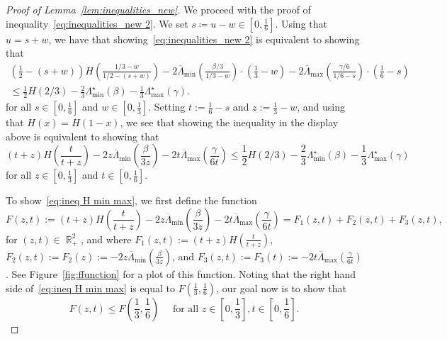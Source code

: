 \documentclass[11pt]{article}
\numberwithin{equation}{section}
\DeclareMathOperator{\R}{\mathbb{R}} %
\theoremstyle{definition}
\begin{document}
\begin{proof}[Proof of Lemma~\ref{lem:inequalities_new}]
We proceed with the proof of inequality~\eqref{eq:inequalities_new 2}. 
We set $s\coloneqq u-w \in \left[0,\frac{1}{6} \right]$. Using that $u=s+w$, we have that showing~\eqref{eq:inequalities_new 2} is equivalent to showing that 
\begin{multline*}
         \left( \frac{1}{2} - (s+w) \right) H\left(\frac{1/3 - w}{1/2 - (s+w)}\right) - 2\overline{\Lambda}_{\min} \left(  \frac{\beta/3}{1/3 - w} \right) \cdot \left( \frac{1}{3} - w \right)
     - 2\overline{\Lambda}_{\max} \left(\frac{\gamma /6}{1/6 - s} \right) \cdot \left( \frac{1}{6} - s \right)\\
         \leq \frac{1}{2}H(2/3) - \frac{2}{3} \Lambda_{\min}^{\star} (\beta)-\frac{1}{3} \Lambda_{\max}^{\star} (\gamma).
\end{multline*}
for all $s\in \left[0,\frac{1}{6}\right]$ and $w\in \left[0,\frac{1}{3} \right]$. 
Setting 
$t:=\frac{1}{6}-s$ and 
$z:=\frac{1}{3}-w$, 
and using that $H(x)=H(1-x)$, we see that showing the inequality in the display above is equivalent to showing that
\begin{equation}\label{eq:ineq H min max}
    (t+z)H\left(\frac{t}{t+z}\right) - 2z \overline{\Lambda}_{\min} \left(  \frac{\beta}{3z} \right)
     - 2t \overline{\Lambda}_{\max} \left(\frac{\gamma }{6t} \right)  \leq \frac{1}{2}H(2/3) - \frac{2}{3} \Lambda_{\min}^{\star} (\beta)-\frac{1}{3} \Lambda_{\max}^{\star} (\gamma) 
\end{equation}
for all $z \in \left[0,\frac{1}{3}\right]$ and $t \in \left[0,\frac{1}{6}\right]$. 

To show~\eqref{eq:ineq H min max}, we first define the function
    \begin{equation*}
        F(z,t) := (t+z) H \left( \frac{t}{t+z} \right) - 2z \overline{\Lambda}_{\min} \left( \frac{\beta}{3z} \right) - 2t \overline{\Lambda}_{\max} \left( \frac{\gamma}{6 t} \right) 
        = F_{1}(z,t) + F_{2} (z,t) + F_{3}(z,t),
    \end{equation*}
for 
$(z,t) \in \R_{+}^{2}$, 
and where  
$F_{1}(z,t) := (t+z) H \left( \frac{t}{t+z} \right)$, 
$F_{2}(z,t) := F_{2}(z) := - 2z \overline{\Lambda}_{\min} \left( \frac{\beta}{3z} \right)$, 
and 
$F_{3}(z,t) := F_{3}(t) := - 2t \overline{\Lambda}_{\max} \left( \frac{\gamma}{6 t} \right)$. 
See Figure~\ref{fig:ffunction} for a plot of this function. 
Noting that the right hand side of~\eqref{eq:ineq H min max} is equal to $F\left(\frac{1}{3},\frac{1}{6} \right)$, our goal now is to show that 
\[
F(z,t) \leq F\left(\frac{1}{3},\frac{1}{6} \right) 
\quad \text{ for all } z \in \left[0,\frac{1}{3}\right], t \in \left[0,\frac{1}{6}\right].
\]


\end{proof}
\end{document}
